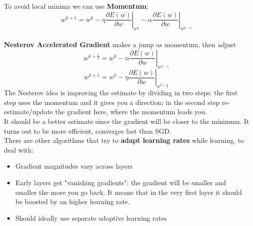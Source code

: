 To avoid local minima we can use \textbf{Momentum}:
$$
w^{k+1}=w^{k}-\left.\eta \frac{\partial E(w)}{\partial w}\right|_{w^{k}}-\left.\alpha \frac{\partial E(w)}{\partial w}\right|_{w^{k-1}}
$$\\

\textbf{Nesterov Accelerated Gradient} makes a jump as momentum, then adjust
$$
w^{k+\frac{1}{2}}=w^{k}-\left.\alpha \frac{\partial E(w)}{\partial w}\right|_{w^{k-1}}
$$
$$
w^{k+1}=w^{k}-\left.\eta \frac{\partial E(w)}{\partial w}\right|_{w^{k+\frac{1}{2}}}
$$
The Nesterov idea is improving the estimate by dividing in two steps: the first step uses the momentum and it gives you a direction; in the second step re-estimate/update the gradient here, where the momentum leads you.\\
It should be a better estimate since the gradient will be closer to the minimum. It turns out to be more efficient, converges fast than SGD. \\


There are other algorithms that try to \textbf{adapt learning rates} while learning, to deal with:
\begin{itemize}
    \item Gradient magnitudes vary across layers
    \item Early layers get "vanishing gradients": the gradient will be smaller and smaller the more you go back. It means that in the very first layer it should be boosted by an higher learning rate. 
    \item Should ideally use separate adaptive learning rates
\end{itemize}{}

